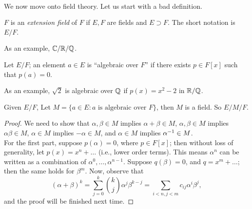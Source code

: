 \\[8pt]
We now move onto field theory. Let us start with a bad definition.
\begin{definition}
    $F$ is an \textit{extension field} of $F$ if $E, F$ are fields and $E \supset F$. The short notation is $E/F$.
\end{definition}
As an example, $\mathbb C/\mathbb R/\mathbb Q$.
\begin{definition}
    Let $E/F$; an element $a \in E$ is ``algebraic over $F$'' if there exists $p \in F[x]$ such that $p(a) = 0$.
\end{definition}
As an example, $\sqrt{2}$ is algebraic over $\mathbb Q$ if $p(x) = x^2 - 2$ in $\mathbb R/\mathbb Q$.
\begin{theorem}
    Given $E/F$, Let $M = \{a \in E : a \text{ is algebraic over $F$}\}$, then $M$ is a field. So $E/M/F$.
\end{theorem}
\begin{proof}
    We need to show that $\alpha, \beta \in M$ implies $\alpha + \beta \in M$, $\alpha, \beta \in M$ implies $\alpha \beta \in M$, $\alpha \in M$ implies $-\alpha \in M$, and $\alpha \in M$ implies $\alpha^{-1} \in M$.
    \\[8pt]
    For the first part, suppose $p(\alpha) = 0$, where $p \in F[x]$; then without loss of generality, let $p(x) = x^n + \dots$ (i.e., lower order terms). This means $\alpha^n$ can be written as a combination of $\alpha^0, \dots, \alpha^{n-1}$. Suppose $q(\beta) = 0$, and $q = x^m + \dots$; then the same holds for $\beta^m$. Now, observe that
    \[ (\alpha + \beta)^k = \sum_{j=0}^k \binom{k}{j} \alpha^j \beta^{k-j} = \sum_{i<n, j<m} c_{ij} \alpha^i \beta^j, \]
    and the proof will be finished next time.
\end{proof}